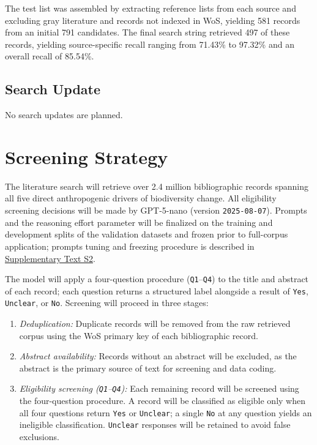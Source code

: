 \documentclass[12pt]{article}
\begin{document}
The test list was assembled by extracting reference lists from each source and excluding gray literature and records not indexed in WoS, yielding 581 records from an initial 791 candidates. The final search string retrieved 497 of these records, yielding source-specific recall ranging from 71.43\% to 97.32\% and an overall recall of 85.54\%. 

\subsection*{Search Update}
No search updates are planned. 
\section*{Screening Strategy}
The literature search will retrieve over 2.4 million bibliographic records spanning all five direct anthropogenic drivers of biodiversity change. All eligibility screening decisions will be made by GPT-5-nano (version \texttt{2025-08-07}). Prompts and the reasoning effort parameter will be finalized on the training and development splits of the validation datasets and frozen prior to full-corpus application; prompts tuning and freezing procedure is described in \hyperref[sec:prompts_configs] {Supplementary Text S2}.

The model will apply a four-question procedure (\texttt{Q1}--\texttt{Q4}) to the title and abstract of each record; each question returns a structured label alongside a result of \texttt{Yes}, \texttt{Unclear}, or \texttt{No}. Screening will proceed in three stages:

\begin{enumerate}[leftmargin=*]
  \item \emph{Deduplication:} Duplicate records will be removed from the raw retrieved corpus using the WoS primary key of each bibliographic record.
  
  \item \emph{Abstract availability:} Records without an abstract will be excluded, as the abstract is the primary source of text for screening and 
  data coding.
  
  \item \emph{Eligibility screening (\texttt{Q1}--\texttt{Q4}):} Each remaining record will be screened using the four-question procedure. A record will be classified as eligible only when all four questions return \texttt{Yes} or \texttt{Unclear}; a single \texttt{No} at any question yields an ineligible classification. \texttt{Unclear} responses will be retained to avoid false exclusions.  
\end{enumerate}
\end{document}
